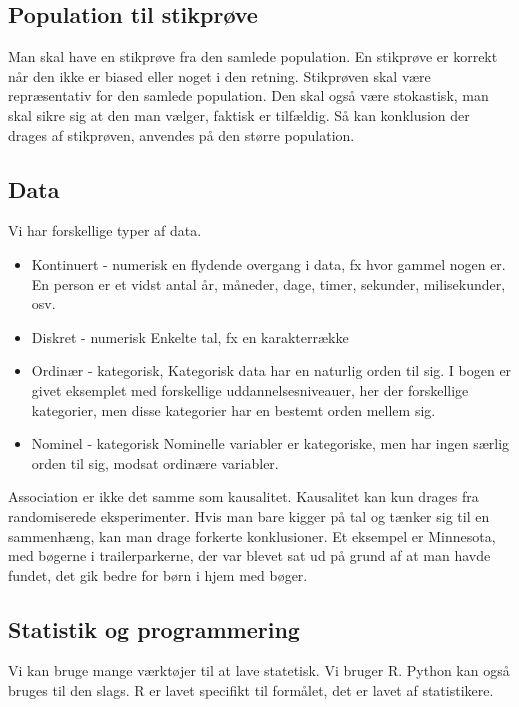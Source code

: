 \documentclass{article}
\begin{document}
\subsection{Population til stikprøve}
Man skal have en stikprøve fra den samlede population. En stikprøve er korrekt
når den ikke er biased eller noget i den retning. Stikprøven skal være
repræsentativ for den samlede population. Den skal også være stokastisk, man
skal sikre sig at den man vælger, faktisk er tilfældig.
Så kan konklusion der drages af stikprøven, anvendes på den større population.

\subsection{Data}
Vi har forskellige typer af data. 

\begin{itemize}
  \item Kontinuert - numerisk
    \subitem en flydende overgang i data, fx hvor gammel nogen er. En person
    er et vidst antal år, måneder, dage, timer, sekunder, milisekunder, osv.
  \item Diskret  - numerisk
    \subitem Enkelte tal, fx en karakterrække
  \item Ordinær - kategorisk,
    \subitem Kategorisk data har en naturlig orden til sig. I bogen er givet
    eksemplet med forskellige uddannelsesniveauer, her der forskellige
    kategorier, men disse kategorier har en bestemt orden mellem sig.
  \item Nominel - kategorisk
    \subitem Nominelle variabler er kategoriske, men har ingen særlig orden til
    sig, modsat ordinære variabler.
\end{itemize}

Association er ikke det samme som kausalitet. Kausalitet kan kun drages fra
randomiserede eksperimenter. Hvis man bare kigger på tal og tænker sig til en
sammenhæng, kan man drage forkerte konklusioner. Et eksempel er Minnesota, med
bøgerne i trailerparkerne, der var blevet sat ud på grund af at man havde
fundet, det gik bedre for børn i hjem med bøger.

\subsection{Statistik og programmering}
  Vi kan bruge mange værktøjer til at lave statetisk. Vi bruger R. Python kan
  også bruges til den slags. R er lavet specifikt til formålet, det er lavet af
  statistikere.
\end{document}
